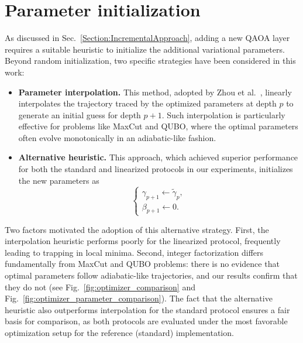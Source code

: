 \section{Parameter initialization}
\label{Section:ParameterInitialization}

As discussed in Sec.~\ref{Section:IncrementalApproach}, adding a new QAOA layer requires a suitable heuristic to initialize the additional variational parameters. Beyond random initialization, two specific strategies have been considered in this work:

\begin{itemize}
    \item \textbf{Parameter interpolation.}  
    This method, adopted by Zhou et al.~\cite{zhou_quantum_2020}, linearly interpolates the trajectory traced by the optimized parameters at depth $p$ to generate an initial guess for depth $p+1$. Such interpolation is particularly effective for problems like MaxCut and QUBO, where the optimal parameters often evolve monotonically in an adiabatic-like fashion.

    \item \textbf{Alternative heuristic.}  
    This approach, which achieved superior performance for both the standard and linearized protocols in our experiments, initializes the new parameters as
    \begin{equation}
        \begin{cases}
            \gamma_{p+1} \leftarrow \widetilde{\gamma}_{p}, \\
            \beta_{p+1} \leftarrow 0.
        \end{cases}
        \label{eq:initialization_heuristic}
    \end{equation}
\end{itemize}

Two factors motivated the adoption of this alternative strategy.  
First, the interpolation heuristic performs poorly for the linearized protocol, frequently leading to trapping in local minima.  
Second, integer factorization differs fundamentally from MaxCut and QUBO problems: there is no evidence that optimal parameters follow adiabatic-like trajectories, and our results confirm that they do not (see Fig.~\ref{fig:optimizer_comparison} and Fig.~\ref{fig:optimizer_parameter_comparison}).  
The fact that the alternative heuristic also outperforms interpolation for the standard protocol ensures a fair basis for comparison, as both protocols are evaluated under the most favorable optimization setup for the reference (standard) implementation.
